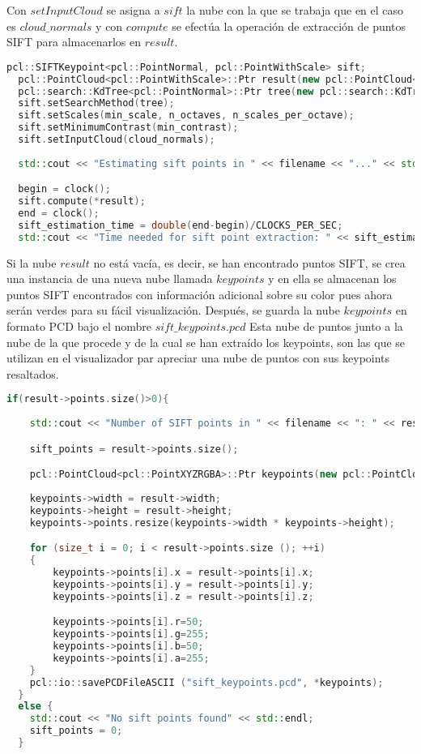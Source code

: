 Con $setInputCloud$ se asigna a $sift$ la nube con la que se trabaja que en el caso es $cloud\_normals$ y con $compute$ se efectúa la operación de extracción de puntos SIFT para almacenarlos en $result$.


\begin{lstlisting}[language=C++,breaklines]
  pcl::SIFTKeypoint<pcl::PointNormal, pcl::PointWithScale> sift;
  pcl::PointCloud<pcl::PointWithScale>::Ptr result(new pcl::PointCloud<pcl::PointWithScale>);
  pcl::search::KdTree<pcl::PointNormal>::Ptr tree(new pcl::search::KdTree<pcl::PointNormal> ());
  sift.setSearchMethod(tree);
  sift.setScales(min_scale, n_octaves, n_scales_per_octave);
  sift.setMinimumContrast(min_contrast);
  sift.setInputCloud(cloud_normals);
 
  std::cout << "Estimating sift points in " << filename << "..." << std::endl;

  begin = clock();
  sift.compute(*result);
  end = clock();
  sift_estimation_time = double(end-begin)/CLOCKS_PER_SEC;
  std::cout << "Time needed for sift point extraction: " << sift_estimation_time << " seconds" << std::endl << std::endl;
\end{lstlisting}

Si la nube $result$ no está vacía, es decir, se han encontrado puntos SIFT, se crea una instancia de una nueva nube llamada $keypoints$ y en ella se almacenan los puntos SIFT encontrados con información adicional sobre su color pues ahora serán verdes para su fácil visualización. Después, se guarda la nube $keypoints$ en formato PCD bajo el nombre $sift\_keypoints.pcd$
Esta nube de puntos junto a la nube de la que procede y de la cual se han extraído los keypoints, son las que se utilizan en el visualizador par apreciar una nube de puntos con sus keypoints resaltados.

\begin{lstlisting}[language=C++,breaklines]
  if(result->points.size()>0){
  
  	std::cout << "Number of SIFT points in " << filename << ": " << result->points.size () << std::endl;

	sift_points = result->points.size();

	pcl::PointCloud<pcl::PointXYZRGBA>::Ptr keypoints(new pcl::PointCloud<pcl::PointXYZRGBA>);
  
	keypoints->width = result->width;
	keypoints->height = result->height;
	keypoints->points.resize(keypoints->width * keypoints->height);

   	for (size_t i = 0; i < result->points.size (); ++i)
  	{
    	keypoints->points[i].x = result->points[i].x;
    	keypoints->points[i].y = result->points[i].y;
    	keypoints->points[i].z = result->points[i].z;

  		keypoints->points[i].r=50;
  		keypoints->points[i].g=255;
  		keypoints->points[i].b=50;
  		keypoints->points[i].a=255;
  	}
  	pcl::io::savePCDFileASCII ("sift_keypoints.pcd", *keypoints);
  }
  else {
  	std::cout << "No sift points found" << std::endl;
	sift_points = 0;
  }
\end{lstlisting}


